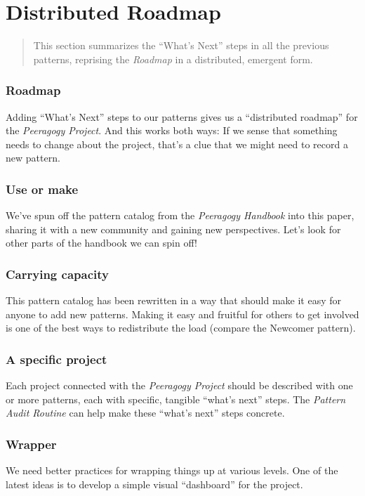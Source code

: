 \section{Distributed Roadmap} \label{sec:Distributed_Roadmap}

\begin{quote}
This section summarizes the ``What's Next'' steps in all the previous
patterns, reprising the \emph{Roadmap} in a distributed, emergent form.
\end{quote}

\subsubsection*{Roadmap} Adding ``What's Next'' steps to our patterns gives us a ``distributed roadmap'' for the \emph{Peeragogy Project}.  And this works both ways:  
If we sense that something needs to change about the project, that's a
clue that we might need to record a new pattern.

\subsubsection*{Use or make} 
We've spun off the pattern catalog from the \emph{Peeragogy Handbook} into this paper, sharing it with a new community and gaining new perspectives.  Let's look for other parts of the handbook we can spin off!

\subsubsection*{Carrying capacity} This pattern catalog has been rewritten in a way that should make it
easy for anyone to add new patterns. Making it easy and fruitful for
others to get involved is one of the best ways to redistribute the load
(compare the Newcomer pattern).

\subsubsection*{A specific project} 
 Each project connected with the \emph{Peeragogy Project} should be described with one or more patterns, each with specific, tangible ``what's next'' steps.  The \emph{Pattern Audit Routine} can help make these ``what's next'' steps concrete.

\subsubsection*{Wrapper}  We need better practices for wrapping things up at
various levels.  One of the latest ideas is to develop a simple visual
``dashboard'' for the project.


